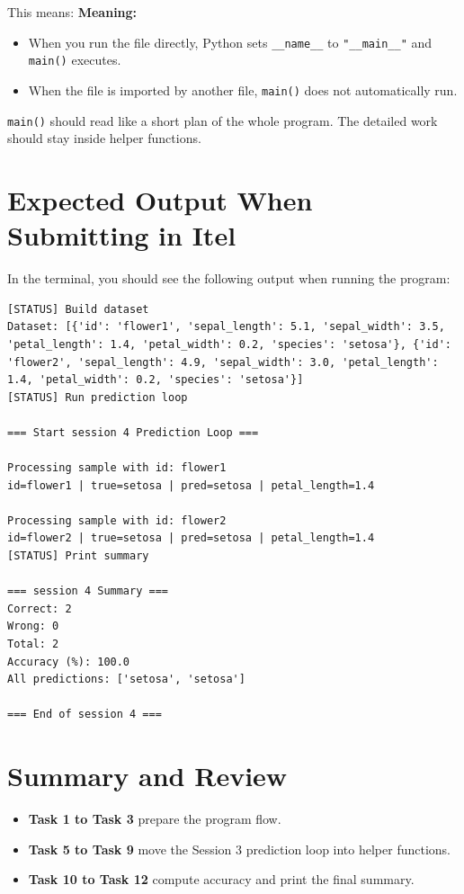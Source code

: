 This means:
\noindent
\textbf{Meaning:}
\begin{itemize}
    \item When you run the file directly, Python sets \texttt{\_\_name\_\_} to \texttt{"\_\_main\_\_"} and \texttt{main()} executes.
    \item When the file is imported by another file, \texttt{main()} does not automatically run.
\end{itemize}


\begin{tcolorbox}[title=Good Practice]
\texttt{main()} should read like a short plan of the whole program. The detailed work should stay inside helper functions.
\end{tcolorbox}

\section{Expected Output When Submitting in Itel}

In the terminal, you should see the following output when running the program:
\begin{verbatim}
[STATUS] Build dataset
Dataset: [{'id': 'flower1', 'sepal_length': 5.1, 'sepal_width': 3.5, 'petal_length': 1.4, 'petal_width': 0.2, 'species': 'setosa'}, {'id': 'flower2', 'sepal_length': 4.9, 'sepal_width': 3.0, 'petal_length': 1.4, 'petal_width': 0.2, 'species': 'setosa'}]
[STATUS] Run prediction loop

=== Start session 4 Prediction Loop ===

Processing sample with id: flower1
id=flower1 | true=setosa | pred=setosa | petal_length=1.4

Processing sample with id: flower2
id=flower2 | true=setosa | pred=setosa | petal_length=1.4
[STATUS] Print summary

=== session 4 Summary ===
Correct: 2
Wrong: 0
Total: 2
Accuracy (%): 100.0
All predictions: ['setosa', 'setosa']

=== End of session 4 ===
\end{verbatim}



\section{Summary and Review}
\begin{itemize}
    \item \textbf{Task 1 to Task 3} prepare the program flow.
    \item \textbf{Task 5 to Task 9} move the Session 3 prediction loop into helper functions.
    \item \textbf{Task 10 to Task 12} compute accuracy and print the final summary.
\end{itemize}

